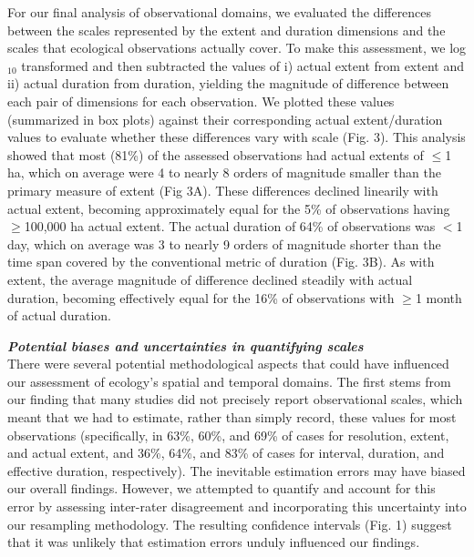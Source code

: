 \documentclass[12pt]{article}
\begin{document}
For our final analysis of observational domains, we evaluated the differences between the scales represented by the extent and duration dimensions and the scales that ecological observations actually cover. To make this assessment, we log$_{10}$ transformed and then subtracted the values of i) actual extent from extent and ii) actual duration from duration, yielding the magnitude of difference between each pair of dimensions for each observation. We plotted these values (summarized in box plots) against their corresponding actual extent/duration values to evaluate whether these differences vary with scale (Fig. 3). This analysis showed that most (81\%) of the assessed observations had actual extents of $\leq$1 ha, which on average were 4 to nearly 8 orders of magnitude smaller than the primary measure of extent (Fig 3A). These differences declined linearily with actual extent, becoming approximately equal for the 5\% of observations having $\geq$100,000 ha actual extent. The actual duration of 64\% of observations was $<$1 day, which on average was 3 to nearly 9 orders of magnitude shorter than the time span covered by the conventional metric of duration (Fig. 3B). As with extent, the average magnitude of difference declined steadily with actual duration, becoming effectively equal for the 16\% of observations with $\geq$1 month of actual duration. 


\noindent \textbf{\emph{Potential biases and uncertainties in quantifying scales}}\\
There were several potential methodological aspects that could have influenced our assessment of ecology's spatial and temporal domains. The first stems from our finding that many studies did not precisely report observational scales, which meant that we had to estimate, rather than simply record, these values for most observations (specifically, in 63\%, 60\%, and 69\% of cases for resolution, extent, and actual extent, and 36\%, 64\%, and 83\% of cases for interval, duration, and effective duration, respectively). The inevitable estimation errors may have biased our overall findings. However, we attempted to quantify and account for this error by assessing inter-rater disagreement and incorporating this uncertainty into our resampling methodology. The resulting confidence intervals (Fig. 1) suggest that it was unlikely that estimation errors unduly influenced our findings. 
\end{document}
